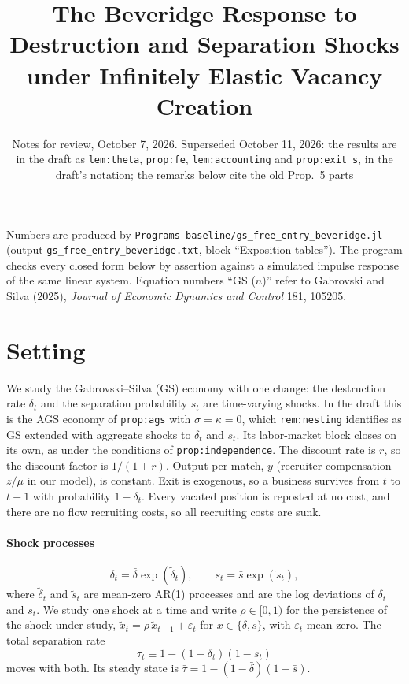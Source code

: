 \documentclass[authoryear, review, 12pt]{elsarticle}
\begin{document}
\begin{frontmatter}
\title{The Beveridge Response to Destruction and Separation Shocks under Infinitely Elastic
Vacancy Creation}
\author{Notes for review, October 7, 2026. Superseded October 11, 2026: the results are in the draft as \texttt{lem:theta}, \texttt{prop:fe}, \texttt{lem:accounting} and \texttt{prop:exit\_s}, in the draft's notation; the remarks below cite the old Prop.~5 parts}
\end{frontmatter}

\noindent Numbers are produced by \texttt{Programs baseline/gs\_free\_entry\_beveridge.jl}
(output \texttt{gs\_free\_entry\_beveridge.txt}, block ``Exposition tables''). The program
checks every closed form below by assertion against a simulated impulse response of the
same linear system. Equation numbers ``GS ($n$)'' refer to Gabrovski and Silva (2025),
\emph{Journal of Economic Dynamics and Control} 181, 105205.

\section{Setting}

We study the Gabrovski--Silva (GS) economy with one change: the destruction rate $\delta_t$
and the separation probability $s_t$ are time-varying shocks. In the draft this is the AGS economy of \texttt{prop:ags} with
$\sigma=\kappa=0$, which \texttt{rem:nesting} identifies as GS extended with aggregate
shocks to $\delta_t$ and $s_t$. Its labor-market block closes on its own, as under the
conditions of \texttt{prop:independence}. The discount rate is $r$,
so the discount factor is $1/(1+r)$. Output per match, $y$ (recruiter compensation $z/\mu$
in our model), is constant. Exit is exogenous, so a business survives from $t$ to $t+1$
with probability $1-\delta_t$. Every vacated position is reposted at no cost, and there are
no flow recruiting costs, so all recruiting costs are sunk.

\paragraph{Shock processes}
\[
	\delta_t=\bar\delta\exp(\tilde\delta_t),
	\qquad
	s_t=\bar s\exp(\tilde s_t),
\]
where $\tilde\delta_t$ and $\tilde s_t$ are mean-zero AR(1) processes and are the log
deviations of $\delta_t$ and $s_t$. We study one shock at a time and write $\rho\in[0,1)$
for the persistence of the shock under study, $\tilde x_t=\rho\,\tilde x_{t-1}+\varepsilon_t$
for $x\in\{\delta,s\}$, with $\varepsilon_t$ mean zero. The total separation rate
\[
	\tau_t\equiv1-(1-\delta_t)(1-s_t)
\]
moves with both. Its steady state is $\bar\tau=1-(1-\bar\delta)(1-\bar s)$.
\end{document}
